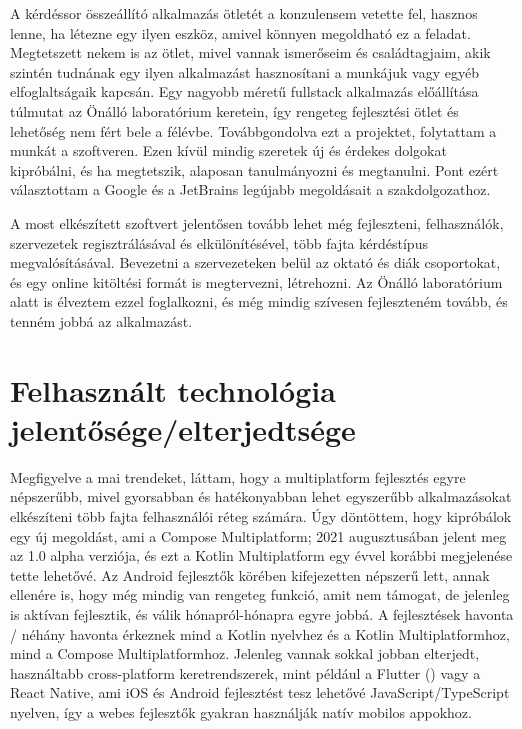 A kérdéssor összeállító alkalmazás ötletét a konzulensem vetette fel, hasznos lenne, ha létezne egy ilyen eszköz, amivel könnyen megoldható ez a feladat.
Megtetszett nekem is az ötlet, mivel vannak ismerőseim és családtagjaim, akik szintén tudnának egy ilyen alkalmazást hasznosítani a munkájuk vagy egyéb elfoglaltságaik kapcsán.
Egy nagyobb méretű fullstack alkalmazás előállítása túlmutat az Önálló laboratórium keretein, így rengeteg fejlesztési ötlet és lehetőség nem fért bele a félévbe.
Továbbgondolva ezt a projektet, folytattam a munkát a szoftveren.
Ezen kívül mindig szeretek új és érdekes dolgokat kipróbálni, és ha megtetszik, alaposan tanulmányozni és megtanulni.
Pont ezért választottam a Google és a JetBrains legújabb megoldásait a szakdolgozathoz.

A most elkészített szoftvert jelentősen tovább lehet még fejleszteni, felhasználók, szervezetek regisztrálásával és elkülönítésével, több fajta kérdéstípus megvalósításával.
Bevezetni a szervezeteken belül az oktató és diák csoportokat, és egy online kitöltési formát is megtervezni, létrehozni.
Az Önálló laboratórium alatt is élveztem ezzel foglalkozni, és még mindig szívesen fejleszteném tovább, és tenném jobbá az alkalmazást.

\section{Felhasznált technológia jelentősége/elterjedtsége}
\label{sec:IntroductionTechnologies}

Megfigyelve a mai trendeket, láttam, hogy a multiplatform fejlesztés egyre népszerűbb, mivel gyorsabban és hatékonyabban lehet egyszerűbb alkalmazásokat elkészíteni több fajta felhasználói réteg számára.
Úgy döntöttem, hogy kipróbálok egy új megoldást, ami a Compose Multiplatform; 2021 augusztusában jelent meg az 1.0 alpha verziója, és ezt a Kotlin Multiplatform egy évvel korábbi megjelenése tette lehetővé.
Az Android fejlesztők körében kifejezetten népszerű lett, annak ellenére is, hogy még mindig van rengeteg funkció, amit nem támogat, de jelenleg is aktívan fejlesztik, és válik hónapról-hónapra egyre jobbá.
A fejlesztések havonta / néhány havonta érkeznek mind a Kotlin nyelvhez és a Kotlin Multiplatformhoz\cite{KotlinMultiplatformRelease}, mind a Compose Multiplatformhoz\cite{ComposeMultiplatformRelease}.
Jelenleg vannak sokkal jobban elterjedt, használtabb cross-platform keretrendszerek, mint például a Flutter () vagy a React Native, ami iOS és Android fejlesztést tesz lehetővé JavaScript/TypeScript nyelven, így a webes fejlesztők gyakran használják natív mobilos appokhoz.

